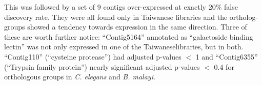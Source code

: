 This was followed by a set of 9 contigs over-expressed at exactly 20\%
false discovery rate. They were all found only in Taiwanese libraries
and the ortholog-groups showed a tendency towards expression in the
same direction. Three of these are worth further notice:
``Contig5164'' annotated as ``galactoside binding lectin'' was not
only expressed in one of the Taiwaneselibraries, but in
both. ``Contig110'' (``cysteine protease'') had adjusted p-values $<$
1 and ``Contig6355'' (``Trypsin family protein'') nearly significant
adjusted p-values $<$ 0.4 for orthologous groups in
\textit{C. elegans} and \textit{B. malayi}.



